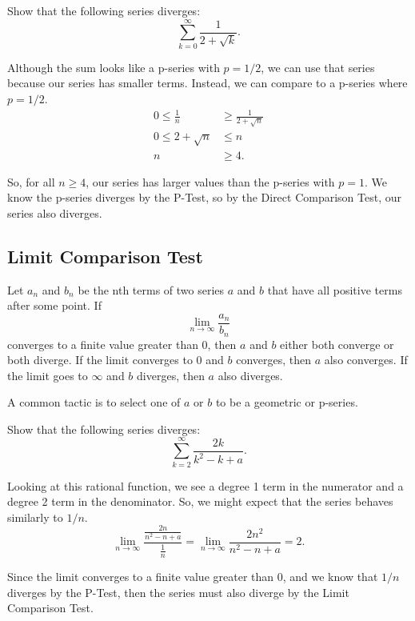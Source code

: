 \begin{example}
	Show that the following series diverges:
	\begin{equation*}
		\sum_{k=0}^{\infty}{\frac{1}{2+\sqrt{k}}}.
	\end{equation*}
\end{example}
\begin{answer}
	Although the sum looks like a p-series with $p=1/2$, we can use that series because our series has smaller terms.
	Instead, we can compare to a p-series where $p=1/2$.
	\begin{align*}
		0 \leq \frac{1}{n} &\geq \frac{1}{2+\sqrt{n}} \\
		0 \leq 2 + \sqrt{n} &\leq n \\
		n & \geq 4.
	\end{align*}
	
	So, for all $n \geq 4$, our series has larger values than the p-series with $p=1$.
	We know the p-series diverges by the P-Test, so by the Direct Comparison Test, our series also diverges.
\end{answer}

\subsection{Limit Comparison Test}
\begin{lemma}
	Let $a_n$ and $b_n$ be the nth terms of two series $a$ and $b$ that have all positive terms after some point.
	If
	\begin{equation*}
		\lim_{n\to\infty}{\frac{a_n}{b_n}}
	\end{equation*}
	converges to a finite value greater than 0, then $a$ and $b$ either both converge or both diverge.
	If the limit converges to 0 and $b$ converges, then $a$ also converges.
	If the limit goes to $\infty$ and $b$ diverges, then $a$ also diverges.
\end{lemma}

A common tactic is to select one of $a$ or $b$ to be a geometric or p-series.

\begin{example}
	Show that the following series diverges:
	\begin{equation*}
		\sum_{k=2}^{\infty}{\frac{2k}{k^2-k+a}}.
	\end{equation*}
\end{example}
\begin{answer}
	Looking at this rational function, we see a degree 1 term in the numerator and a degree 2 term in the denominator.
	So, we might expect that the series behaves similarly to $1/n$.
	\begin{equation*}
		\lim_{n\to\infty}{\frac{\frac{2n}{n^2-n+a}}{\frac{1}{n}}} = \lim_{n\to\infty}{\frac{2n^2}{n^2-n+a}} = 2.
	\end{equation*}
	
	Since the limit converges to a finite value greater than 0, and we know that $1/n$ diverges by the P-Test, then the series must also diverge by the Limit Comparison Test.
\end{answer}

